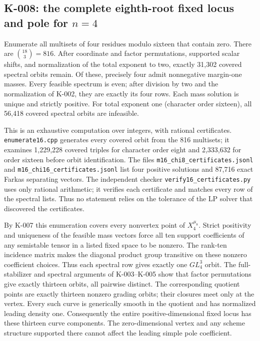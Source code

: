 \subsection{K-008: the complete eighth-root fixed locus and pole for $n=4$}
Enumerate all multisets of four residues modulo sixteen that contain
zero. There are $\binom{18}{3}=816$. After coordinate and factor
permutations, supported scalar shifts, and normalization of the total
exponent to two, exactly 31,302 covered spectral orbits remain.
Of these, precisely four admit nonnegative margin-one masses.
Every feasible spectrum is even; after division by two and the
normalization of K-002, they are exactly its four rows. Each mass
solution is unique and strictly positive. For total exponent one
(character order sixteen), all 56,418 covered spectral orbits are
infeasible.

This is an exhaustive computation over integers, with rational
certificates. \texttt{enumerate16.cpp} generates every covered orbit
from the 816 multisets; it examines 1,229,228 covered triples for
character order eight and 2,333,632 for order sixteen before orbit
identification. The files
\texttt{m16\_chi8\_certificates.jsonl} and
\texttt{m16\_chi16\_certificates.jsonl} list four positive solutions
and 87,716 exact Farkas separating vectors. The independent checker
\texttt{verify16\_certificates.py} uses only rational arithmetic;
it verifies each certificate and matches every row of the spectral
lists. Thus no statement relies on the tolerance of the LP solver
that discovered the certificates.

By K-007 this enumeration covers every nonvertex point of
$X_4^{\mu_8}$. Strict positivity and uniqueness of the feasible mass
vectors force all ten support coefficients of any semistable tensor
in a listed fixed space to be nonzero. The rank-ten incidence matrix
makes the diagonal product group transitive on these nonzero
coefficient choices. Thus each spectral row gives exactly one
$GL_4^3$ orbit. The full-stabilizer and spectral arguments of
K-003--K-005 show that factor permutations give exactly thirteen
orbits, all pairwise distinct. The corresponding quotient points
are exactly thirteen nonzero grading orbits; their closures meet
only at the vertex. Every such curve is generically smooth in the
quotient and has normalized leading density one.
Consequently the entire positive-dimensional fixed locus has these
thirteen curve components. The zero-dimensional vertex and any
scheme structure supported there cannot affect the leading simple
pole coefficient.

